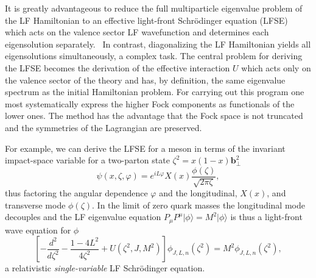 \documentclass[prd,aps,onecolumn,nofootinbib]{revtex4}
\newcommand{\mbf}[1]{\mathbf{#1}}
\begin{document}
It is greatly advantageous to reduce the full multiparticle eigenvalue problem of the LF Hamiltonian to an effective light-front Schr\"odinger equation (LFSE) which acts on the valence sector LF wavefunction and determines each eigensolution separately.~\cite{Pauli:1998tf}   In contrast,  diagonalizing the LF Hamiltonian yields all eigensolutions simultaneously,
a complex task.
The central problem for deriving the LFSE becomes the derivation of the effective interaction $U$ which acts only on the valence sector of the theory and has, by definition, the same eigenvalue spectrum as the initial Hamiltonian problem. For carrying out this program one most systematically express the higher Fock components as functionals of the lower ones. The method has the advantage that the Fock space is not truncated and the symmetries of the Lagrangian are preserved.~\cite{Pauli:1998tf}


For example, we can derive the  LFSE for a meson  in terms of the invariant impact-space variable for a two-parton state $\zeta^2= x(1-x)\mbf{b}_\perp^2$ 
\begin{equation} \label{eq:psiphi}
\psi(x,\zeta, \varphi) = e^{i L \varphi} X(x) \frac{\phi(\zeta)}{\sqrt{2 \pi \zeta}} ,
\end{equation}
thus factoring the angular dependence $\varphi$ and the longitudinal, $X(x)$, and transverse mode $\phi(\zeta)$.
In the limit of zero quark masses the longitudinal mode decouples and
the LF eigenvalue equation $P_\mu P^\mu \vert \phi \rangle  =  M^2 \vert \phi \rangle$
is thus a light-front  wave equation for $\phi$
\begin{equation} \label{LFWE}
\left[-\frac{d^2}{d\zeta^2}
- \frac{1 - 4L^2}{4\zeta^2} + U\left(\zeta^2, J, M^2\right) \right]
\phi_{J,L,n}(\zeta^2) = M^2 \phi_{J,L,n}(\zeta^2),
\end{equation}
a relativistic {\it single-variable}  LF  Schr\"odinger equation. 
\end{document}
